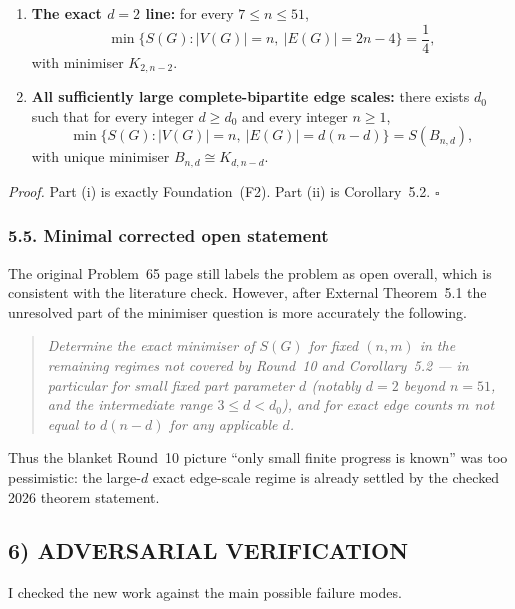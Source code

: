 \begin{enumerate}
\item[(i)] \textbf{The exact $d=2$ line:} for every $7\le n\le 51$,
\[
\min\{S(G): |V(G)|=n,\ |E(G)|=2n-4\}=\frac14,
\]
with minimiser $K_{2,n-2}$.

\item[(ii)] \textbf{All sufficiently large complete-bipartite edge scales:} there exists $d_0$ such that for every integer $d\ge d_0$ and every integer $n\ge 1$,
\[
\min\{S(G): |V(G)|=n,\ |E(G)|=d(n-d)\}=S(B_{n,d}),
\]
with unique minimiser $B_{n,d}\cong K_{d,n-d}$.
\end{enumerate}

\medskip
\textit{Proof.}
Part (i) is exactly Foundation~(F2).
Part (ii) is Corollary~5.2.
\hfill$\square$

\subsubsection*{5.5. Minimal corrected open statement}

The original Problem~65 page still labels the problem as open overall, which is consistent with the literature check. However, after External Theorem~5.1 the unresolved part of the minimiser question is more accurately the following.

\begin{quote}
\emph{Determine the exact minimiser of $S(G)$ for fixed $(n,m)$ in the remaining regimes not covered by Round~10 and Corollary~5.2 --- in particular for small fixed part parameter $d$ (notably $d=2$ beyond $n=51$, and the intermediate range $3\le d<d_0$), and for exact edge counts $m$ not equal to $d(n-d)$ for any applicable $d$.}
\end{quote}

Thus the blanket Round~10 picture ``only small finite progress is known'' was too pessimistic: the large-$d$ exact edge-scale regime is already settled by the checked 2026 theorem statement.

\subsection*{6) ADVERSARIAL VERIFICATION}

I checked the new work against the main possible failure modes.

